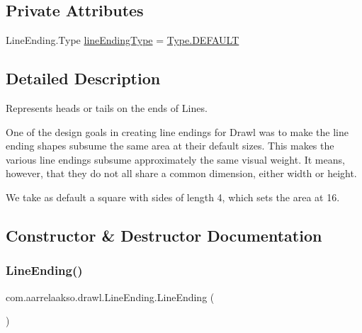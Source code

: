 \subsection*{Private Attributes}
\begin{DoxyCompactItemize}
\item 
Line\+Ending.\+Type \hyperlink{classcom_1_1aarrelaakso_1_1drawl_1_1_line_ending_a0f407b000ff81f764af791028e8e34b6}{line\+Ending\+Type} = \hyperlink{enumcom_1_1aarrelaakso_1_1drawl_1_1_line_ending_1_1_type_a60839eb2ed0486a6f9f987c64d27e313}{Type.\+D\+E\+F\+A\+U\+LT}
\end{DoxyCompactItemize}


\subsection{Detailed Description}
Represents heads or tails on the ends of Lines. 

One of the design goals in creating line endings for Drawl was to make the line ending shapes subsume the same area at their default sizes. This makes the various line endings subsume approximately the same visual weight. It means, however, that they do not all share a common dimension, either width or height.

We take as default a square with sides of length 4, which sets the area at 16. 

\subsection{Constructor \& Destructor Documentation}
\mbox{\label{classcom_1_1aarrelaakso_1_1drawl_1_1_line_ending_ae3ae4bbd1469b24e585b8626872c66a9}} 
\subsubsection{\texorpdfstring{Line\+Ending()}{LineEnding()}\hspace{0.1cm}{\footnotesize\ttfamily [1/2]}}
{\footnotesize\ttfamily com.\+aarrelaakso.\+drawl.\+Line\+Ending.\+Line\+Ending (\begin{DoxyParamCaption}{ }\end{DoxyParamCaption})}



